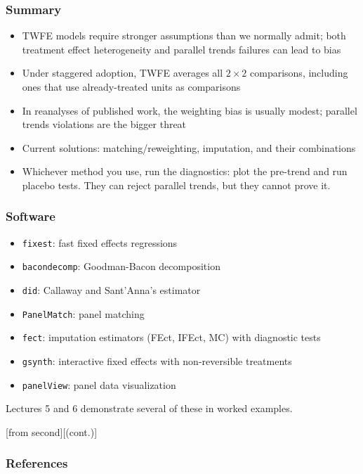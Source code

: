 \documentclass[xcolor=svgnames,9pt,english, aspectratio=169]{beamer}
\begin{document}
\begin{frame}
  \frametitle{Summary}
\begin{itemize}[<+->]\itemsep1.2em
\item TWFE models require stronger assumptions than we normally admit; both treatment effect heterogeneity and parallel trends failures can lead to bias
\item Under staggered adoption, TWFE averages all $2\times 2$ comparisons, including ones that use already-treated units as comparisons
\item In reanalyses of published work, the weighting bias is usually modest; parallel trends violations are the bigger threat
\item Current solutions: matching/reweighting, imputation, and their combinations
\item Whichever method you use, run the diagnostics: plot the pre-trend and run placebo tests. They can reject parallel trends, but they cannot prove it.
\end{itemize}
\end{frame}

\begin{frame}
  \frametitle{Software}
\begin{itemize}\itemsep0.5em
\item \texttt{fixest}: fast fixed effects regressions
\item \texttt{bacondecomp}: Goodman-Bacon decomposition
\item \texttt{did}: Callaway and Sant'Anna's estimator
\item \texttt{PanelMatch}: panel matching
\item \texttt{fect}: imputation estimators (FEct, IFEct, MC) with diagnostic tests
\item \texttt{gsynth}: interactive fixed effects with non-reversible treatments
\item \texttt{panelView}: panel data visualization
\end{itemize}
\bigskip
Lectures 5 and 6 demonstrate several of these in worked examples.
\end{frame}

\appendix

[from second][(cont.)]
\begin{frame}[t,allowframebreaks=1.0]
  \frametitle{References}
\end{frame}
\end{document}

